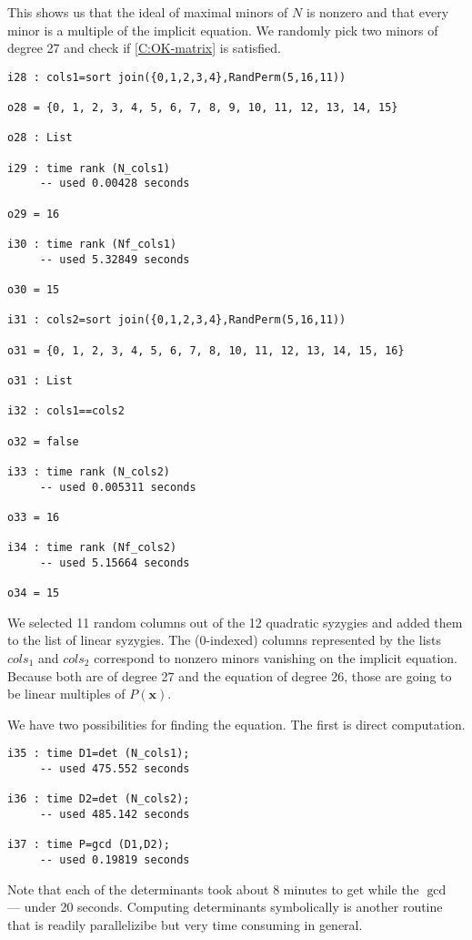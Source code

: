 \documentclass[fleqn,reqno]{amsart}
\numberwithin{first}{chapter}
\begin{document}
This shows us that the ideal of maximal minors of $N$ is nonzero
and that every minor is a multiple of the implicit equation.
We randomly pick two minors of degree 27 and check if \ref{C:OK-matrix}
is satisfied.

\begin{verbatim}
i28 : cols1=sort join({0,1,2,3,4},RandPerm(5,16,11))

o28 = {0, 1, 2, 3, 4, 5, 6, 7, 8, 9, 10, 11, 12, 13, 14, 15}

o28 : List

i29 : time rank (N_cols1)
     -- used 0.00428 seconds

o29 = 16

i30 : time rank (Nf_cols1)
     -- used 5.32849 seconds

o30 = 15

i31 : cols2=sort join({0,1,2,3,4},RandPerm(5,16,11))

o31 = {0, 1, 2, 3, 4, 5, 6, 7, 8, 10, 11, 12, 13, 14, 15, 16}

o31 : List

i32 : cols1==cols2

o32 = false

i33 : time rank (N_cols2)
     -- used 0.005311 seconds

o33 = 16

i34 : time rank (Nf_cols2)
     -- used 5.15664 seconds

o34 = 15

\end{verbatim}

We selected 11 random columns out of the 12 quadratic syzygies and added them
to the list of linear syzygies.
The (0-indexed) columns represented by the lists $cols_1$ and $cols_2$ correspond
to nonzero minors vanishing on the implicit equation.
Because both are of degree 27 and the equation of degree 26,
those are going to be linear multiples of $P(\mathbf x)$.

We have two possibilities for finding the equation. The first is direct computation.

\begin{verbatim}
i35 : time D1=det (N_cols1);
     -- used 475.552 seconds

i36 : time D2=det (N_cols2);
     -- used 485.142 seconds

i37 : time P=gcd (D1,D2);
     -- used 0.19819 seconds

\end{verbatim}

Note that each of the determinants took about 8 minutes to get
while the $\gcd$ --- under 20 seconds.
Computing determinants symbolically is another routine that is
readily parallelizibe but very time consuming in general.
\end{document}
